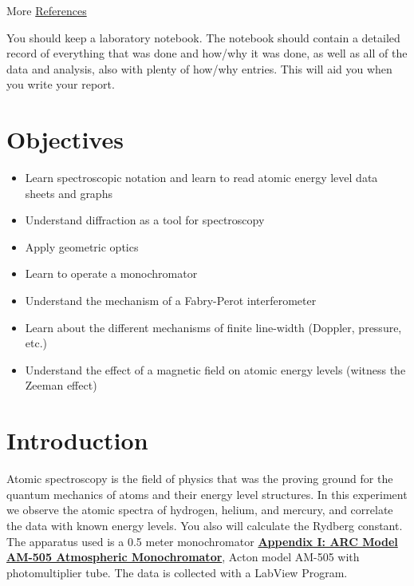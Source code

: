 \documentclass{../lab}
\begin{document}
\noindent More \hyperref[sec:References]{References}

You should keep a laboratory notebook. The notebook should contain a detailed record of everything that was done and how/why it was done, as well as all of the data and analysis, also with plenty of how/why entries. This will aid you when you write your report.

\section{Objectives}

\begin{itemize}
    \item Learn spectroscopic notation and learn to read atomic energy level data sheets and graphs

    \item Understand diffraction as a tool for spectroscopy

    \item Apply geometric optics

    \item Learn to operate a monochromator

    \item Understand the mechanism of a Fabry-Perot interferometer

    \item Learn about the different mechanisms of finite line-width (Doppler, pressure, etc.)

    \item Understand the effect of a magnetic field on atomic energy levels (witness the Zeeman effect)

\end{itemize}

\section{Introduction}

Atomic spectroscopy is the field of physics that was the proving ground for the quantum mechanics of atoms and their energy level structures. In this experiment we observe the atomic spectra of hydrogen, helium, and mercury, and correlate the data with known energy levels. You also will calculate the Rydberg constant. The apparatus used is a 0.5 meter monochromator \href{http://experimentationlab.berkeley.edu/ATMAppendix1}{\textbf{Appendix I: ARC Model AM-505 Atmospheric Monochromator}}, Acton model AM-505 with photomultiplier tube. The data is collected with a LabView Program.
\end{document}

